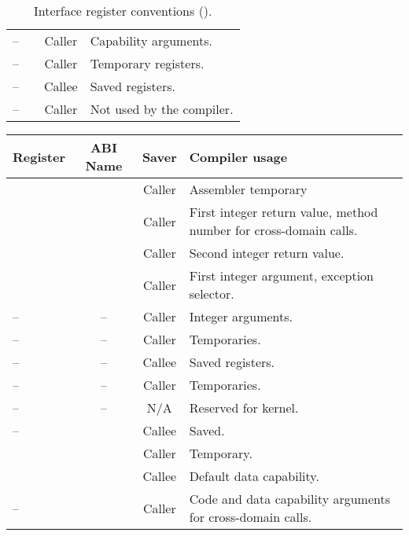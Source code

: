 \begin{table}
\begin{center}
\begin{tabu}{lccX}
			--  &                     & Caller & Capability arguments. \\
			-- &                     & Caller & Temporary registers.\\
			-- &                     & Callee & Saved registers. \\
			-- &                     & Caller & Not used by the compiler.\\
			\bottomrule
		\end{tabu}
		\caption{\label{tbl:hybridreguse}Interface register conventions (\hybridABI).}
	\end{center}
\end{table}

\begin{table}
	\begin{center}
		\begin{tabu}{lccX}
			\toprule
			\headerrow
			Register             & ABI Name            & Saver  & Compiler usage \\
			\midrule
			              &             & Caller & Assembler temporary\\
			              &             & Caller & First integer return value, method number for cross-domain calls.\\
			              &             & Caller & Second integer return value.\\
			              &             & Caller & First integer argument, exception selector.\\
			--    & --  & Caller & Integer arguments.\\
			--    & --  & Caller & Temporaries.\\
			--   & --  & Callee & Saved registers.\\
			--   & --  & Caller & Temporaries.\\
			--   & --& N/A    & Reserved for kernel.\\
			--   &                     & Callee & Saved.\\
			             &                     & Caller & Temporary.\\
			\midrule
			             &                     & Callee & Default data capability.\\
			--   &                     & Caller & Code and data capability arguments for cross-domain calls. \\

\end{tabu}
\end{center}
\end{table}
